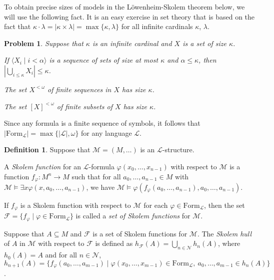 \documentclass[10pt]{amsart}
\renewcommand{\L}{\mathcal{L}}
\newcommand{\MM}{\mathcal{M}}
\newcommand{\NN}{\mathcal{N}}
\newtheorem{problem}[theorem]{Problem}
\theoremstyle{definition}
\newtheorem{definition}[theorem]{Definition}
\theoremstyle{remark}
\newenvironment{enumerate-(a)}{\begin{enumerate}[label={\upshape (\alph*)}, leftmargin=2pc]}{\end{enumerate}}
\begin{document}
To obtain precise sizes of models in the L\"owenheim-Skolem theorem below, we will use the following fact. It is an easy exercise in set theory that is based on the fact that $\kappa\cdot\lambda=|\kappa\times\lambda|= \max\{\kappa,\lambda\}$ for all infinite cardinals $\kappa$, $\lambda$. 

\begin{problem} \label{cardinality of the set of finite subsets} 
Suppose that $\kappa$ is an infinite cardinal and $X$ is a set of size $\kappa$. 
\begin{enumerate-(a)} 
\item 
If $\langle X_i\mid i<\alpha\rangle$ is a sequence of sets of size at most $\kappa$ and $\alpha\leq\kappa$, then $|\bigcup_{i\leq\kappa} X_i|\leq\kappa$. 
\item 
The set $X^{<\omega}$ of finite sequences in $X$ has size $\kappa$. 
\item 
The set $[X]^{<\omega}$ of finite subsets of $X$ has size $\kappa$. 
\end{enumerate-(a)} 
\end{problem} 

Since any formula is a finite sequence of symbols, it follows that $|\mathrm{Form}_\L|=\max\{|\L|,\omega\}$ for any language $\L$. 

\begin{definition} 
Suppose that $\MM=(M,\dots)$ is an $\L$-structure. 
\begin{enumerate-(a)} 
\item 
A \emph{Skolem function} for an $\L$-formula $\varphi(x_0,\dots,x_{n-1})$ with respect to $\MM$ is a function $f_{\varphi}\colon M^n\rightarrow M$ such that for all $a_0,\dots,a_{n-1}\in M$ with $\MM\models \exists x \varphi(x,a_0,\dots,a_{n-1})$, we have $\MM\models \varphi(f_\varphi(a_0,\dots,a_{n-1}),a_0,\dots,a_{n-1})$. 
\item 
If $f_\varphi$ is a Skolem function with respect to $\MM$ for each $\varphi\in \mathrm{Form}_\L$, then the set $\mathcal{F}=\{f_\varphi\mid \varphi\in\mathrm{Form}_\L\}$ is called a \emph{set of Skolem functions} for $\MM$. 
\item 
Suppose that $A\subseteq M$ and $\mathcal{F}$ is a set of Skolem functions for $\MM$. The \emph{Skolem hull} of $A$ in $\MM$ with respect to $\mathcal{F}$ is defined as $h_{\mathcal{F}}(A)=\bigcup_{n\in\NN} h_n(A)$, where $h_0(A)=A$ and for all $n\in\NN$, $h_{n+1}(A)=\{f_\varphi(a_0,\dots,a_{m-1})\mid \varphi(x_0,\dots,x_{m-1})\in\mathrm{Form}_\L,\ a_0,\dots,a_{m-1}\in h_n(A)\}$. 
\end{enumerate-(a)} 
\end{definition} 
\end{document}
